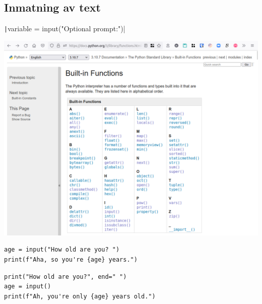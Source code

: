 \subsection{Inmatning av text}

\begin{frame}
  \begin{center}
    \texttt|variable = input("Optional prompt:")|
  \end{center}
\end{frame}

\begin{frame}[fragile]
  \includegraphics[height=\textheight]{figs/docs-builtins.png}
\end{frame}

\begin{frame}[fragile]
  \begin{example}
    \begin{verbatim}
age = input("How old are you? ")
print(f"Aha, so you're {age} years.")
    \end{verbatim}
  \end{example}

  \pause

  \begin{example}
    \begin{verbatim}
print("How old are you?", end=" ")
age = input()
print(f"Ah, you're only {age} years old.")
    \end{verbatim}
  \end{example}
\end{frame}

